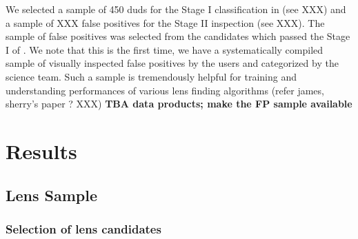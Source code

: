 \documentclass[useAMS,usenatbib,a4paper]{mn2e}
\begin{document}
We selected a sample of 450 duds for the Stage I classification in \sw
(see XXX) and a sample of XXX false positives for the Stage II
inspection (see XXX). The sample of false positives was selected from
the candidates which passed the Stage I of \sw. We note that this is the
first time, we have a systematically compiled sample of visually
inspected false positives by the \sw users and categorized by the
science team. Such a sample is tremendously helpful for training and
understanding performances of various lens finding algorithms (refer
james, sherry's paper ? XXX)
{\bf TBA data products; make the FP sample available}


\section{Results}
\label{sec:results}

\subsection{\sw Lens Sample}

\subsubsection{Selection of \sw lens candidates}
\label{sec:results:stage1}
\end{document}

